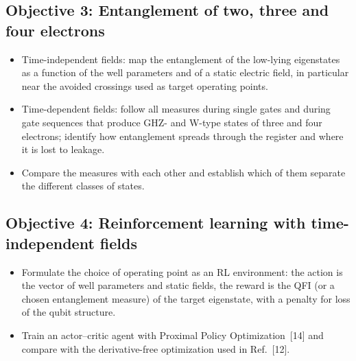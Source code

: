 \documentclass[12pt,a4paper]{article}
\begin{document}
\subsection*{Objective 3: Entanglement of two, three and four electrons}
\begin{itemize}
  \item Time-independent fields: map the entanglement of the
  low-lying eigenstates as a function of the well parameters and of
  a static electric field, in particular near the avoided crossings
  used as target operating points.
  \item Time-dependent fields: follow all measures during single
  gates and during gate sequences that produce GHZ- and W-type states
  of three and four electrons; identify how entanglement spreads
  through the register and where it is lost to leakage.
  \item Compare the measures with each other and establish which of
  them separate the different classes of states.
\end{itemize}

\subsection*{Objective 4: Reinforcement learning with time-independent fields}
\begin{itemize}
  \item Formulate the choice of operating point as an RL environment:
  the action is the vector of well parameters and static fields, the
  reward is the QFI (or a chosen entanglement measure) of the target
  eigenstate, with a penalty for loss of the qubit structure.
  \item Train an actor--critic agent with Proximal Policy
  Optimization~[14] and compare with the derivative-free
  optimization used in Ref.~[12].
\end{itemize}
\end{document}
